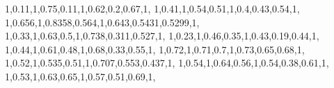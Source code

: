 \documentclass[
]{book}
\newenvironment{Shaded}{\begin{snugshade}}{\end{snugshade}}
\newcommand{\DecValTok}[1]{\textcolor[rgb]{0.00,0.00,0.81}{#1}}
\newcommand{\FloatTok}[1]{\textcolor[rgb]{0.00,0.00,0.81}{#1}}
\newcommand{\NormalTok}[1]{#1}
\begin{document}
\begin{Shaded}
\begin{Highlighting}[]
        \DecValTok{1}\NormalTok{,}\FloatTok{0.11}\NormalTok{,}\DecValTok{1}\NormalTok{,}\FloatTok{0.75}\NormalTok{,}\FloatTok{0.11}\NormalTok{,}\DecValTok{1}\NormalTok{,}\FloatTok{0.62}\NormalTok{,}\FloatTok{0.2}\NormalTok{,}\FloatTok{0.67}\NormalTok{,}\DecValTok{1}\NormalTok{,}
        \DecValTok{1}\NormalTok{,}\FloatTok{0.41}\NormalTok{,}\DecValTok{1}\NormalTok{,}\FloatTok{0.54}\NormalTok{,}\FloatTok{0.51}\NormalTok{,}\DecValTok{1}\NormalTok{,}\FloatTok{0.4}\NormalTok{,}\FloatTok{0.43}\NormalTok{,}\FloatTok{0.54}\NormalTok{,}\DecValTok{1}\NormalTok{,}
        \DecValTok{1}\NormalTok{,}\FloatTok{0.656}\NormalTok{,}\DecValTok{1}\NormalTok{,}\FloatTok{0.8358}\NormalTok{,}\FloatTok{0.564}\NormalTok{,}\DecValTok{1}\NormalTok{,}\FloatTok{0.643}\NormalTok{,}\FloatTok{0.5431}\NormalTok{,}\FloatTok{0.5299}\NormalTok{,}\DecValTok{1}\NormalTok{,}
        \DecValTok{1}\NormalTok{,}\FloatTok{0.33}\NormalTok{,}\DecValTok{1}\NormalTok{,}\FloatTok{0.63}\NormalTok{,}\FloatTok{0.5}\NormalTok{,}\DecValTok{1}\NormalTok{,}\FloatTok{0.738}\NormalTok{,}\FloatTok{0.311}\NormalTok{,}\FloatTok{0.527}\NormalTok{,}\DecValTok{1}\NormalTok{,}
        \DecValTok{1}\NormalTok{,}\FloatTok{0.23}\NormalTok{,}\DecValTok{1}\NormalTok{,}\FloatTok{0.46}\NormalTok{,}\FloatTok{0.35}\NormalTok{,}\DecValTok{1}\NormalTok{,}\FloatTok{0.43}\NormalTok{,}\FloatTok{0.19}\NormalTok{,}\FloatTok{0.44}\NormalTok{,}\DecValTok{1}\NormalTok{,}
        \DecValTok{1}\NormalTok{,}\FloatTok{0.44}\NormalTok{,}\DecValTok{1}\NormalTok{,}\FloatTok{0.61}\NormalTok{,}\FloatTok{0.48}\NormalTok{,}\DecValTok{1}\NormalTok{,}\FloatTok{0.68}\NormalTok{,}\FloatTok{0.33}\NormalTok{,}\FloatTok{0.55}\NormalTok{,}\DecValTok{1}\NormalTok{,}
        \DecValTok{1}\NormalTok{,}\FloatTok{0.72}\NormalTok{,}\DecValTok{1}\NormalTok{,}\FloatTok{0.71}\NormalTok{,}\FloatTok{0.7}\NormalTok{,}\DecValTok{1}\NormalTok{,}\FloatTok{0.73}\NormalTok{,}\FloatTok{0.65}\NormalTok{,}\FloatTok{0.68}\NormalTok{,}\DecValTok{1}\NormalTok{,}
        \DecValTok{1}\NormalTok{,}\FloatTok{0.52}\NormalTok{,}\DecValTok{1}\NormalTok{,}\FloatTok{0.535}\NormalTok{,}\FloatTok{0.51}\NormalTok{,}\DecValTok{1}\NormalTok{,}\FloatTok{0.707}\NormalTok{,}\FloatTok{0.553}\NormalTok{,}\FloatTok{0.437}\NormalTok{,}\DecValTok{1}\NormalTok{,}
        \DecValTok{1}\NormalTok{,}\FloatTok{0.54}\NormalTok{,}\DecValTok{1}\NormalTok{,}\FloatTok{0.64}\NormalTok{,}\FloatTok{0.56}\NormalTok{,}\DecValTok{1}\NormalTok{,}\FloatTok{0.54}\NormalTok{,}\FloatTok{0.38}\NormalTok{,}\FloatTok{0.61}\NormalTok{,}\DecValTok{1}\NormalTok{,}
        \DecValTok{1}\NormalTok{,}\FloatTok{0.53}\NormalTok{,}\DecValTok{1}\NormalTok{,}\FloatTok{0.63}\NormalTok{,}\FloatTok{0.65}\NormalTok{,}\DecValTok{1}\NormalTok{,}\FloatTok{0.57}\NormalTok{,}\FloatTok{0.51}\NormalTok{,}\FloatTok{0.69}\NormalTok{,}\DecValTok{1}\NormalTok{,}

\end{Highlighting}
\end{Shaded}
\end{document}
